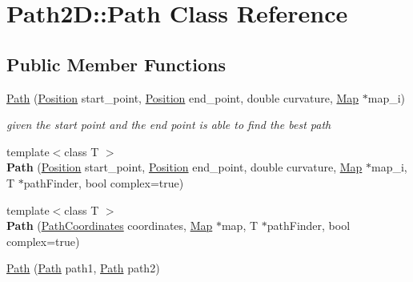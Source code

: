 \hypertarget{class_path2_d_1_1_path}{}\section{Path2D\+:\+:Path Class Reference}
\label{class_path2_d_1_1_path}
\subsection*{Public Member Functions}
\begin{DoxyCompactItemize}
\item 
\mbox{\hyperlink{class_path2_d_1_1_path_ae91ac6b923538c7c6ba6645f5866b848}{Path}} (\mbox{\hyperlink{class_path2_d_1_1_element_1_1_position}{Position}} start\+\_\+point, \mbox{\hyperlink{class_path2_d_1_1_element_1_1_position}{Position}} end\+\_\+point, double curvature, \mbox{\hyperlink{class_map}{Map}} $\ast$map\+\_\+i)
\begin{DoxyCompactList}\small\item\em given the start point and the end point is able to find the best path \end{DoxyCompactList}\item 
\mbox{\label{class_path2_d_1_1_path_ab8f8d4c9428e57dd03a62e7d4e1f5fad}} 
{\footnotesize template$<$class T $>$ }\\{\bfseries Path} (\mbox{\hyperlink{class_path2_d_1_1_element_1_1_position}{Position}} start\+\_\+point, \mbox{\hyperlink{class_path2_d_1_1_element_1_1_position}{Position}} end\+\_\+point, double curvature, \mbox{\hyperlink{class_map}{Map}} $\ast$map\+\_\+i, T $\ast$path\+Finder, bool complex=true)
\item 
\mbox{\label{class_path2_d_1_1_path_a960942babbfcb89c8b153b7fe18b84a3}} 
{\footnotesize template$<$class T $>$ }\\{\bfseries Path} (\mbox{\hyperlink{class_path2_d_1_1_element_1_1_path_coordinates}{Path\+Coordinates}} coordinates, \mbox{\hyperlink{class_map}{Map}} $\ast$map, T $\ast$path\+Finder, bool complex=true)
\item 
\mbox{\label{class_path2_d_1_1_path_a4f06b4846dfb847641c0d96539e000b3}} 
\mbox{\hyperlink{class_path2_d_1_1_path_a4f06b4846dfb847641c0d96539e000b3}{Path}} (\mbox{\hyperlink{class_path2_d_1_1_path}{Path}} path1, \mbox{\hyperlink{class_path2_d_1_1_path}{Path}} path2)

\end{DoxyCompactItemize}
